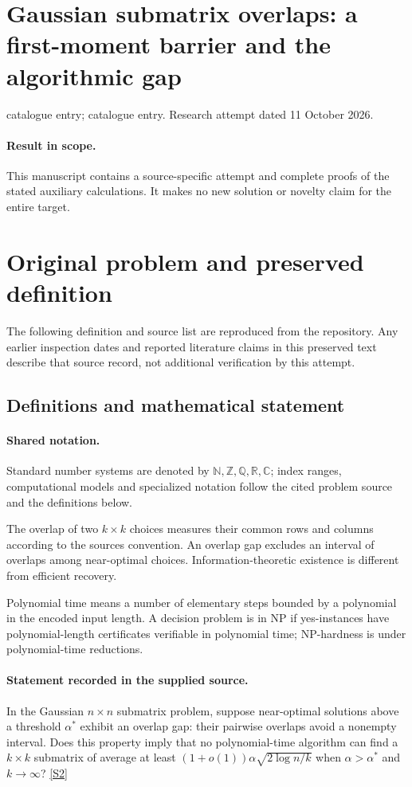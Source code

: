 \documentclass[11pt]{article}
\begin{document}
\section*{Gaussian submatrix overlaps: a first-moment barrier and the algorithmic gap}
\noindent catalogue entry; catalogue entry. Research attempt dated 11 October 2026.
\paragraph{Result in scope.}This manuscript contains a source-specific attempt and complete proofs of the stated auxiliary calculations. It makes no new solution or novelty claim for the entire target.
\section{Original problem and preserved definition}
The following definition and source list are reproduced from the repository. Any earlier inspection dates and reported literature claims in this preserved text describe that source record, not additional verification by this attempt.
\subsection{Definitions and mathematical statement}

\paragraph{Shared notation.}Standard number systems are denoted by $\mathbb N,\mathbb Z,\mathbb Q,\mathbb R,\mathbb C$; index ranges, computational models and specialized notation follow the cited problem source and the definitions below.


The overlap of two $k\times k$ choices measures their common rows and columns according to the source\textquotesingle s convention. An overlap gap excludes an interval of overlaps among near-optimal choices. Information-theoretic existence is different from efficient recovery.

Polynomial time means a number of elementary steps bounded by a polynomial in the encoded input length. A decision problem is in $\mathrm{NP}$ if yes-instances have polynomial-length certificates verifiable in polynomial time; NP-hardness is under polynomial-time reductions.
\paragraph{Statement recorded in the supplied source.}
In the Gaussian $n\times n$ submatrix problem, suppose near-optimal solutions above a threshold $\alpha^*$ exhibit an overlap gap: their pairwise overlaps avoid a nonempty interval. Does this property imply that no polynomial-time algorithm can find a $k\times k$ submatrix of average at least $(1+o(1))\alpha\sqrt{2\log n/k}$ when $\alpha>\alpha^*$ and $k\to\infty$? \href{https://doi.org/10.4171/owr/2016/22}{[S2]}
\end{document}
